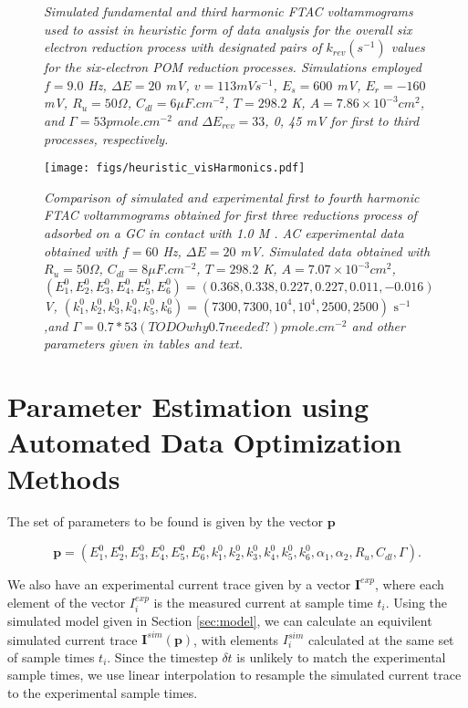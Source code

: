 \documentclass[a4paper, 12pt]{article}
\begin{document}
\begin{figure}[htbp]
    \caption{\it{Simulated fundamental and third harmonic FTAC voltammograms 
    used to assist in heuristic form of data analysis for the overall six 
    electron reduction process with designated pairs of $k_{rev} (s^{-1})$ 
    values for the six-electron POM reduction processes. Simulations employed $f 
    = 9.0$ Hz, $\Delta E = 20$ mV, $v = 113 mV s^{-1}$, $E_{s} = 600$ mV, 
    $E_{r} = -160$ mV, $R_u = 50 \Omega$, $C_{dl} = 6 \mu F.cm^{-2}$, $T = 
    298.2$ K, $A = 7.86 \times 10^{-3} cm^2$, and $\Gamma = 53 pmole.cm^{-2}$ 
    and $\Delta E_{rev} = 33$, 0, 45 mV for first to third processes, 
    respectively.}}
    \label{fig:sim_for_heuristic_k}
\end{figure}

\begin{figure}[htbp]
\texttt{[image: figs/heuristic\_visHarmonics.pdf]}
    \caption{\it{Comparison of simulated and experimental first to fourth 
    harmonic FTAC voltammograms obtained for first three reductions process of 
     adsorbed on a GC in contact with 1.0 M . AC
    experimental data obtained with $f = 60$ Hz, $\Delta E = 20$ mV. Simulated
    data obtained with $R_u = 50 \Omega$, $C_{dl} = 8 \mu F.cm^{-2}$, $T =
    298.2$ K, $A = 7.07 \times 10^{-3} cm^2$,
    $(E^0_1,E^0_2,E^0_3,E^0_4,E^0_5,E^0_6) = (0.368, 0.338, 0.227, 0.227, 0.011,
    -0.016)$ V, $(k^0_1,k^0_2,k^0_3,k^0_4,k^0_5,k^0_6) = (7300, 7300, 10^4,
    10^4, 2500, 2500)\text{ s}^{-1}$,and $\Gamma = 0.7*53 (TODO why 0.7 needed?)
    pmole.cm^{-2}$ and other parameters given in tables and text.}}
    \label{fig:sim_and_exp}
\end{figure}


\section{Parameter Estimation using Automated Data Optimization Methods}\label{sec:automated}

The set of parameters to be found is given by the vector $\mathbf{p}$

$$
\mathbf{p} =
(E^0_1,E^0_2,E^0_3,E^0_4,E^0_5,E^0_6,k^0_1,k^0_2,k^0_3,k^0_4,k^0_5,k^0_6,
         \alpha_1,
         \alpha_2,
         R_u,
         C_{dl},
         \Gamma).
$$

We also have an experimental current trace given by a vector $\mathbf{I}^{exp}$,
where each element of the vector $I^{exp}_i$ is the measured current at sample
time $t_i$. Using the simulated model given in Section \ref{sec:model}, we
can calculate an equivilent simulated current trace
$\mathbf{I}^{sim}(\mathbf{p})$, with elements $I^{sim}_i$ calculated at the same
set of sample times $t_i$. Since the timestep $\delta t$ is unlikely to match
the experimental sample times, we use linear interpolation to resample the
simulated current trace to the experimental sample times.
\end{document}
